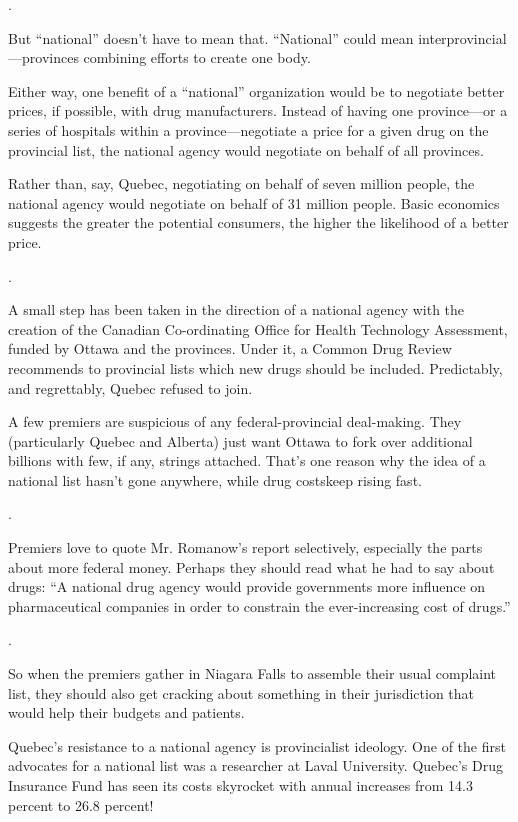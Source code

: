 {\linefill.

But ``national'' doesn't have to mean that. ``National'' could mean
interprovincial---provinces combining efforts to create one body.

Either way, one benefit of a ``national'' organization would be to
negotiate better prices, if possible, with drug manufacturers. Instead
of having one province---or a series of hospitals within a
province---negotiate a price for a given drug on the provincial list,
the national agency would negotiate on behalf of all provinces.

Rather than, say, Quebec, negotiating on behalf of seven million people,
the national agency would negotiate on behalf of 31 million people.
Basic economics suggests the greater the potential consumers, the higher
the likelihood of a better price.

\linefill.

A small step has been taken in the direction of a national agency with
the creation of the Canadian Co-ordinating Office for Health Technology
Assessment, funded by Ottawa and the provinces. Under it, a Common Drug
Review recommends to provincial lists which new drugs should be
included. Predictably, and regrettably, Quebec refused to join.

A few premiers are suspicious of any federal-provincial deal-making.
They (particularly Quebec and Alberta) just want Ottawa to fork over
additional billions with few, if any, strings attached. That's one
reason why the idea of a national list hasn't gone anywhere, while drug
costskeep rising fast.

\linefill.

Premiers love to quote Mr. Romanow's report selectively, especially the
parts about more federal money. Perhaps they should read what he had to
say about drugs: ``A national drug agency would provide governments more
influence on pharmaceutical companies in order to constrain the
ever-increasing cost of drugs.''

\linefill.

So when the premiers gather in Niagara Falls to assemble their usual
complaint list, they should also get cracking about something in their
jurisdiction that would help their budgets and patients.

\begin{listmatch}
\item 
Quebec's resistance to a national agency is provincialist
ideology. One of the first advocates for a national list was a
researcher at Laval University. Quebec's Drug Insurance Fund has seen
its costs skyrocket with annual increases from 14.3 percent to 26.8 percent!



\end{listmatch}}
